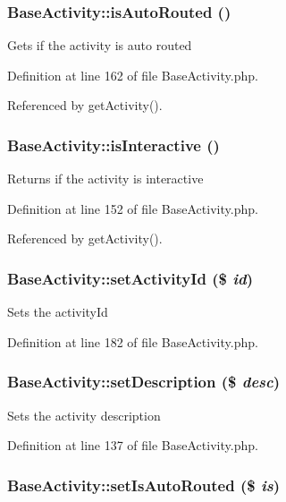 \subsubsection{\setlength{\rightskip}{0pt plus 5cm}Base\-Activity::is\-Auto\-Routed ()}\label{classBaseActivity_a14}


Gets if the activity is auto routed 

Definition at line 162 of file Base\-Activity.php.

Referenced by get\-Activity().
\subsubsection{\setlength{\rightskip}{0pt plus 5cm}Base\-Activity::is\-Interactive ()}\label{classBaseActivity_a12}


Returns if the activity is interactive 

Definition at line 152 of file Base\-Activity.php.

Referenced by get\-Activity().
\subsubsection{\setlength{\rightskip}{0pt plus 5cm}Base\-Activity::set\-Activity\-Id (\$ {\em id})}\label{classBaseActivity_a18}


Sets the activity\-Id 

Definition at line 182 of file Base\-Activity.php.
\subsubsection{\setlength{\rightskip}{0pt plus 5cm}Base\-Activity::set\-Description (\$ {\em desc})}\label{classBaseActivity_a9}


Sets the activity description 

Definition at line 137 of file Base\-Activity.php.
\subsubsection{\setlength{\rightskip}{0pt plus 5cm}Base\-Activity::set\-Is\-Auto\-Routed (\$ {\em is})}\label{classBaseActivity_a13}


